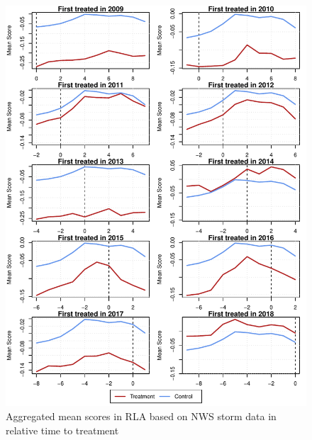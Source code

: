 \begin{figure}[!h]
	\centering
	\includegraphics[scale=1]{"../Code & Data/ParTrendsPlotRLAStorm.pdf"}
	\caption{Aggregated mean scores in RLA based on NWS storm data in relative time to treatment}
	\label{PreTrendsRLAStorm}
\end{figure}

\newpage



